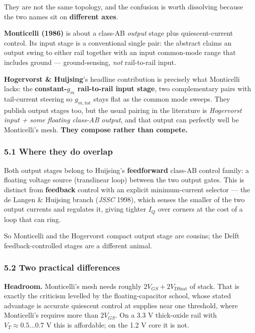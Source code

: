 \documentclass[
  10pt,
  a4paper,
]{article}
\begin{document}
They are not the same topology, and the confusion is worth dissolving
because the two names sit on \textbf{different axes}.

\textbf{Monticelli (1986)} is about a class-AB \emph{output} stage plus
quiescent-current control. Its input stage is a conventional single
pair: the abstract claims an output swing to either rail together with
an input common-mode range that includes ground --- ground-sensing,
\emph{not} rail-to-rail input.

\textbf{Hogervorst \& Huijsing}'s headline contribution is precisely
what Monticelli lacks: the \textbf{constant-\(g_m\) rail-to-rail input
stage}, two complementary pairs with tail-current steering so
\(g_{m,\mathrm{tot}}\) stays flat as the common mode sweeps. They
publish output stages too, but the usual pairing in the literature is
\emph{Hogervorst input + some floating class-AB output}, and that output
can perfectly well be Monticelli's mesh. \textbf{They compose rather
than compete.}

\hypertarget{where-they-do-overlap}{%
\subsubsection{5.1 Where they do overlap}\label{where-they-do-overlap}}

Both output stages belong to Huijsing's \textbf{feedforward} class-AB
control family: a floating voltage source (translinear loop) between the
two output gates. This is distinct from \textbf{feedback} control with
an explicit minimum-current selector --- the de Langen \& Huijsing
branch (\emph{JSSC} 1998), which senses the smaller of the two output
currents and regulates it, giving tighter \(I_Q\) over corners at the
cost of a loop that can ring.

So Monticelli and the Hogervorst compact output stage are cousins; the
Delft feedback-controlled stages are a different animal.

\hypertarget{two-practical-differences}{%
\subsubsection{5.2 Two practical
differences}\label{two-practical-differences}}

\textbf{Headroom.} Monticelli's mesh needs roughly
\(2V_{GS} + 2V_\mathrm{DSsat}\) of stack. That is exactly the criticism
levelled by the floating-capacitor school, whose stated advantage is
accurate quiescent control at supplies near one threshold, where
Monticelli's requires more than \(2V_{GS}\). On a 3.3 V thick-oxide rail
with \(V_T \approx 0.5\ldots0.7\) V this is affordable; on the 1.2 V
core it is not.
\end{document}
